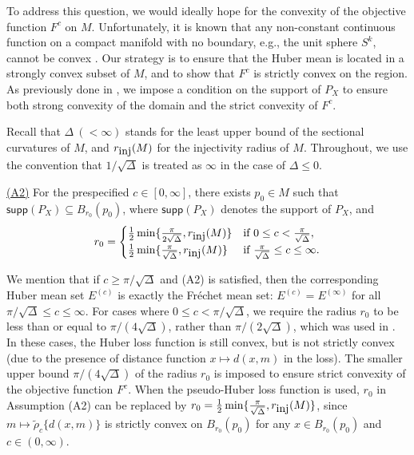\documentclass[preprint]{imsart}
\theoremstyle{plain}
\theoremstyle{remark}
\begin{document}
To address this question, we would ideally hope for the convexity of the objective function  $F^{c}$ on $M$. Unfortunately, it is known that any non-constant continuous function on a compact manifold with no boundary, e.g., the unit sphere $S^k$, cannot be convex \citep{yau1974non}. Our strategy is to ensure that the Huber mean is located in a strongly convex subset of $M$, and to show that $F^{c}$ is strictly convex on the region. As previously done in \cite{yang2010riemannian, afsari2011riemannian}, we impose a condition on the support of $P_{X}$ to ensure both strong convexity of the domain and the strict convexity of $F^c$.

%
Recall that $\Delta ~ (< \infty)$ stands for the least upper bound of the sectional curvatures of $M$, and $r_{\mbox{\tiny inj}}(M)$ for the injectivity radius of $M$.
Throughout, we use the convention that ${1}/{\sqrt{\Delta}}$ is treated as $\infty$ in the case of $\Delta \le 0$. 

\indent \underline{(A2)} For the prespecified $c \in [0, \infty]$, there exists $p_{0} \in M$ such that 
$\textsf{supp}(P_{X}) \subseteq B_{r_0}(p_0)$, where $\textsf{supp}(P_{X})$ denotes the support of $P_{X}$,  and 
\begin{equation}\label{eq:r_0}
    r_0 = \begin{cases}
    \frac{1}{2}\min\{ \frac{\pi}{2\sqrt{\Delta}}, r_{\mbox{\tiny inj}}(M)  \} & \mbox{if} ~  0 \le c < \frac{\pi}{\sqrt{\Delta}},\\
     \frac{1}{2}\min\{\frac{\pi}{\sqrt{\Delta}}, r_{\mbox{\tiny inj}}(M) \} & \mbox{if} ~  \frac{\pi}{\sqrt{\Delta}} \le c \le \infty. \\
\end{cases}
\end{equation} 

We mention that if $c \ge \pi / \sqrt{\Delta}$ and (A2) is satisfied, then the corresponding Huber mean set $E^{(c)}$ is exactly the Fr\'{e}chet mean set: $E^{(c)} = E^{(\infty)}$ for all $\pi / \sqrt{\Delta} \le c \le \infty$. 
For cases where $0 \le c < \pi/\sqrt{\Delta}$, we require the radius $r_0$ to be less than or equal to $\pi/(4\sqrt{\Delta})$, rather than $\pi/(2\sqrt{\Delta})$, which was used in \cite{afsari2011riemannian}. In these cases, the Huber loss function is still convex, but is not strictly convex (due to the presence of distance function $x \mapsto d(x, m)$ in the loss). The smaller upper bound $\pi/(4\sqrt{\Delta})$ of the radius $r_0$ is imposed to ensure strict convexity of the objective function $F^c$. When the pseudo-Huber loss function is used, $r_0$ in Assumption (A2) can be replaced by $r_0 = \tfrac{1}{2}\min\{\tfrac{\pi}{\sqrt{\Delta}}, r_{\mbox{\tiny inj}}(M) \}$, since %
$m \mapsto \tilde{\rho}_{c} \{d(x,m)\}$ is strictly convex on $B_{r_0}(p_0)$ for any $x \in B_{r_0}(p_0)$ and $c \in (0, \infty)$.
\end{document}
